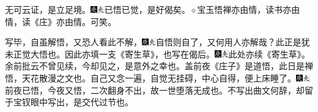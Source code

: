 无可云证，是立足境。{\includegraphics[width=3mm]{../Images/00004}\includegraphics[width=3mm]{../Images/00012}\footnotesize \kaishu 已悟已觉，是好偈矣。{$\diamond$}宝玉悟禅亦由情，读书亦由情，读《庄》亦由情。可笑。}

写毕，自虽解悟，又恐人看此不解，{\includegraphics[width=3mm]{../Images/00004}\includegraphics[width=3mm]{../Images/00012}\footnotesize \kaishu 自悟则自了，又何用人亦解哉？此正是犹未正觉大悟也。}因此亦填一支《寄生草》，也写在偈后。{\includegraphics[width=3mm]{../Images/00004}\includegraphics[width=3mm]{../Images/00012}\footnotesize \kaishu 此处亦续《寄生草》。余前批云不曾见续，今却见之，是意外之幸也。盖前夜《庄子》是道悟，此日是禅悟，天花散漫之文也。}自己又念一遍，自觉无挂碍，中心自得，便上床睡了。{\includegraphics[width=3mm]{../Images/00004}\includegraphics[width=3mm]{../Images/00012}\footnotesize \kaishu 前夜已悟，今夜又悟，二次翻身不出，故一世堕落无成也。不写出曲文何辞，却留于宝钗眼中写出，是交代过节也。}


